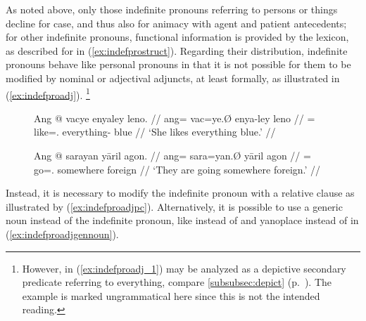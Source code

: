 \begin{figure}[h]
\begin{morphlex}
\ex\label{ex:indefpromorphlex}
\xe
\end{morphlex}
\end{figure}

As noted above, only those indefinite pronouns referring to persons or things
decline for case, and thus also for animacy with agent and patient antecedents;
for other indefinite pronouns, functional information is provided by the
lexicon, as described for  in (\ref{ex:indefprostruct}).
Regarding their distribution, indefinite pronouns behave like personal pronouns
in that it is not possible for them to be modified by nominal or adjectival
adjuncts, at least formally, as illustrated in (\ref{ex:indefproadj}).%
\footnote{However,  in (\ref{ex:indefproadj_1}) may be
analyzed as a depictive secondary predicate referring to 
{everything}, compare \autoref{subsubsec:depict}
(p.~\pageref{subsubsec:depict}). The example is marked ungrammatical here since
this is not the intended reading.}

\begin{figure}
\pex\label{ex:indefproadj}
\a\label{ex:indefproadj_1}\ljudge*\begingl
	\gla Ang @ vacye enyaley leno. //
	\glb ang= vac=ye.Ø enya-ley leno //
	\glc \AgtT{}= like=\TsgF{}.\Top{} everything-\PargI{} blue //
	\glft `She likes everything blue.' //
\endgl

\a\label{ex:indefproadj_2}\ljudge*\begingl
	\gla Ang @ sarayan yāril agon. //
	\glb ang= sara=yan.Ø yāril agon //
	\glc \AgtT{}= go=\TplM{}.\Top{} somewhere foreign //
	\glft `They are going somewhere foreign.' //
\endgl
\xe
\end{figure}

Instead, it is necessary to modify the indefinite pronoun with a relative
clause as illustrated by (\ref{ex:indefproadjpc}). Alternatively, it is
possible to use a generic noun instead of the indefinite pronoun, like
 instead of  and 
{yano}{place} instead of  in
(\ref{ex:indefproadjgennoun}).

